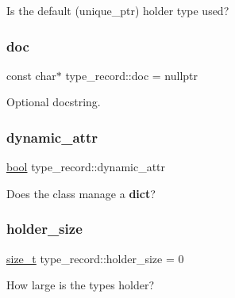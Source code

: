 Is the default (unique\+\_\+ptr) holder type used? 

\mbox{\label{structtype__record_ab343e48279172cd6f8ed5a25036bd02b}} 
\subsubsection{\texorpdfstring{doc}{doc}}
{\footnotesize\ttfamily const char$\ast$ type\+\_\+record\+::doc = nullptr}



Optional docstring. 

\mbox{\label{structtype__record_af7b44bfceaec849cd9832043600b247b}} 
\subsubsection{\texorpdfstring{dynamic\_attr}{dynamic\_attr}}
{\footnotesize\ttfamily \mbox{\hyperlink{asdl_8h_af6a258d8f3ee5206d682d799316314b1}{bool}} type\+\_\+record\+::dynamic\+\_\+attr}



Does the class manage a {\bfseries{dict}}? 

\mbox{\label{structtype__record_a5d94102cfaacdfcf2de248e00fe1afcd}} 
\subsubsection{\texorpdfstring{holder\_size}{holder\_size}}
{\footnotesize\ttfamily \mbox{\hyperlink{detail_2common_8h_a801d6a451a01953ef8cbae6feb6a3638}{size\+\_\+t}} type\+\_\+record\+::holder\+\_\+size = 0}



How large is the type\textquotesingle{}s holder? 

\mbox{\label{structtype__record_ad1d597c02ba9ac676f2c98c96c3ccc54}} 
